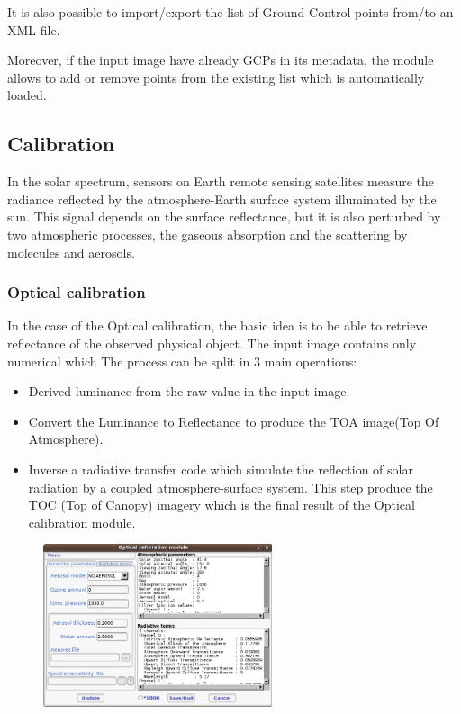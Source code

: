 It is also possible to import/export the list of Ground Control points
from/to an XML file.

Moreover, if the input image have already GCPs in its metadata, the
module allows to add or remove points from the existing list which is
automatically loaded.

\subsection{Calibration}
In the solar spectrum, sensors on Earth remote sensing satellites
measure the radiance reflected by the atmosphere-Earth surface system
illuminated by the sun. This signal depends on the surface
reflectance, but it is also perturbed by two atmospheric processes,
the gaseous absorption and the scattering by molecules and aerosols.


\subsubsection{Optical calibration}
In the case of the Optical calibration, the basic idea is to be able
to retrieve reflectance of the observed physical object.  The input
image contains only numerical which The process can be split in 3 main
operations:
\begin{itemize}
\item Derived luminance from the raw value in the input image. 
\item Convert the Luminance to Reflectance to produce the TOA
  image(Top Of Atmosphere).
\item Inverse a radiative transfer code which simulate the reflection
  of solar radiation by a coupled atmosphere-surface system. This step
  produce the TOC (Top of Canopy) imagery which is the final result of
  the Optical calibration module.
\end{itemize}

\begin{figure}
  \center
  \includegraphics[width=0.6\textwidth]{../Art/MonteverdiImages/monteverdi_optical_calibration.png}
  \label{fig:opticalcalibration}
\end{figure}

